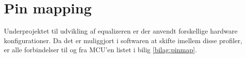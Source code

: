 \section{Pin mapping}

Underprojektet til udvikling af equalizeren er der anvendt forskellige hardware konfigurationer.
Da det er muliggjort i softwaren at skifte imellem disse profiler, er alle forbindelser til og fra MCU'en listet i bilig \ref{bilag:pinmap}.
